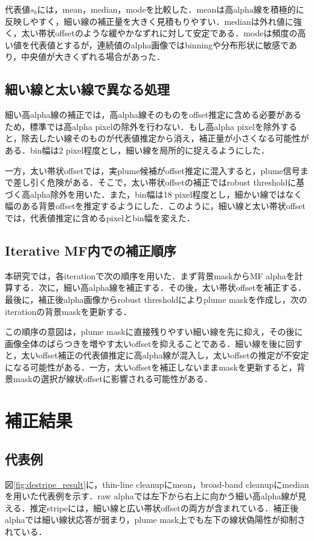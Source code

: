 \documentclass[a4paper,10pt]{ltjsarticle}
\begin{document}
代表値$s_b$には，mean，median，modeを比較した．meanは高alpha線を積極的に反映しやすく，細い線の補正量を大きく見積もりやすい．medianは外れ値に強く，太い帯状offsetのような緩やかなずれに対して安定である．modeは頻度の高い値を代表値とするが，連続値のalpha画像ではbinningや分布形状に敏感であり，中央値が大きくずれる場合があった．

\subsection{細い線と太い線で異なる処理}
細い高alpha線の補正では，高alpha線そのものをoffset推定に含める必要があるため，標準では高alpha pixelの除外を行わない．もし高alpha pixelを除外すると，除去したい線そのものが代表値推定から消え，補正量が小さくなる可能性がある．bin幅は2 pixel程度とし，細い線を局所的に捉えるようにした．

一方，太い帯状offsetでは，実plume候補がoffset推定に混入すると，plume信号まで差し引く危険がある．そこで，太い帯状offsetの補正ではrobust thresholdに基づく高alpha除外を用いた．また，bin幅は18 pixel程度とし，細かい線ではなく幅のある背景offsetを推定するようにした．このように，細い線と太い帯状offsetでは，代表値推定に含めるpixelとbin幅を変えた．

\subsection{Iterative MF内での補正順序}
本研究では，各iterationで次の順序を用いた．まず背景maskからMF alphaを計算する．次に，細い高alpha線を補正する．その後，太い帯状offsetを補正する．最後に，補正後alpha画像からrobust thresholdによりplume maskを作成し，次のiterationの背景maskを更新する．

この順序の意図は，plume maskに直接残りやすい細い線を先に抑え，その後に画像全体のばらつきを増やす太いoffsetを抑えることである．細い線を後に回すと，太いoffset補正の代表値推定に高alpha線が混入し，太いoffsetの推定が不安定になる可能性がある．一方，太いoffsetを補正しないままmaskを更新すると，背景maskの選択が線状offsetに影響される可能性がある．

\section{補正結果}
\subsection{代表例}
図\ref{fig:destripe_result}に，thin-line cleanupにmean，broad-band cleanupにmedianを用いた代表例を示す．raw alphaでは左下から右上に向かう細い高alpha線が見える．推定stripeには，細い線と広い帯状offsetの両方が含まれている．補正後alphaでは細い線状応答が弱まり，plume mask上でも左下の線状偽陽性が抑制されている．
\end{document}
